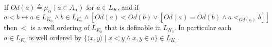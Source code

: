 If $Od(a) \triangleq \mu_{\alpha}(a \in A_{\alpha})$ for $a \in L_K$, and if
$$a < b \leftrightarrow a \in L_{K_0} \land b \in L_{K_0} \land [Od(a) < Od(b) \lor [Od(a) = Od(b) \land a <_{Od(a)} b]]$$
then $<$ is a well ordering of $L_{K_0}$ that is definable in $L_{K_0}$. In particular each $a \in L_{K_0}$ is well ordered by $\{\langle x, y \rangle \mid x < y \land x, y \in a\} \in L_{K_0}$.
